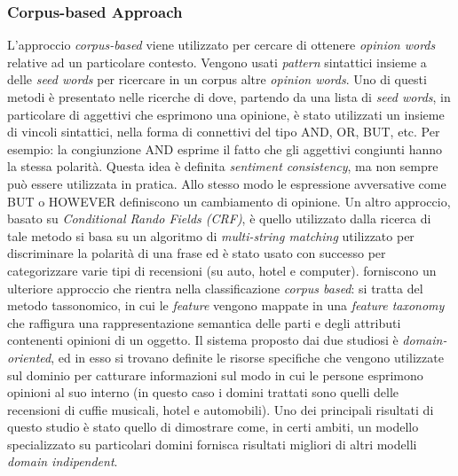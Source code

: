 \documentclass[a4paper,12pt,openright,twoside]{report}
\theoremstyle{definition}
\begin{document}
\subsubsection{Corpus-based Approach}
L'approccio \emph{corpus-based} viene utilizzato per cercare di ottenere \emph{opinion words} relative ad un
particolare contesto. Vengono usati \emph{pattern} sintattici insieme a delle \emph{seed words} per 
ricercare in un corpus
altre \emph{opinion words}.
Uno di questi metodi è presentato nelle ricerche di \cite{Hatz1997}
dove, partendo da una lista di \emph{seed words}, in particolare di aggettivi che esprimono una opinione,
è stato utilizzati un insieme di vincoli sintattici, nella forma di connettivi del tipo AND, OR, BUT, etc.
Per esempio: la congiunzione AND esprime il fatto che gli aggettivi congiunti hanno la stessa polarità. Questa
idea è definita \emph{sentiment consistency}, ma non sempre può essere utilizzata in pratica. Allo stesso modo
le espressione avversative come BUT o HOWEVER definiscono un cambiamento di opinione.
Un altro approccio, basato su \emph{Conditional Rando Fields (CRF)}, è quello utilizzato dalla ricerca di \cite{Jiao2011}
tale metodo si basa su un algoritmo di \emph{multi-string matching}
utilizzato per discriminare la polarità di una frase ed è stato usato
con successo per
categorizzare varie tipi di recensioni (su auto, hotel e computer).
\cite{Cruz2010}
forniscono un ulteriore approccio che rientra nella classificazione \emph{corpus based}:
si tratta del metodo tassonomico, in cui le \emph{feature} vengono mappate in una \emph{feature taxonomy}
che raffigura una rappresentazione semantica delle parti e degli attributi contenenti opinioni
di un oggetto.
Il sistema proposto dai due studiosi  è \emph{domain-oriented}, ed in esso si trovano definite
le risorse specifiche che vengono utilizzate sul dominio per catturare informazioni sul modo 
in cui le persone 
esprimono opinioni al suo interno (in questo caso i domini trattati sono quelli
delle recensioni di cuffie musicali, hotel e automobili).
Uno dei principali risultati di questo studio è stato quello di dimostrare come, in certi ambiti,
un modello specializzato su particolari domini fornisca risultati migliori di altri
modelli \emph{domain indipendent}.
\end{document}
